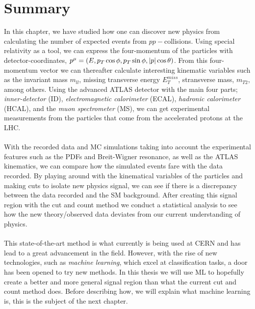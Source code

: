 \documentclass[12pt, a4paper]{book}
\begin{document}
\clearpage
\section{Summary}
In this chapter, we have studied how one can discover new physics from calculating the number of expected events from $pp-$collisions. Using special relativity as a tool, we can express the four-momentum of the particles with 
detector-coordinates, $p^\mu=(E,p_T\cos\phi,p_T\sin\phi,\abs{p}\cos\theta)$. From this four-momentum vector we can thereafter calculate interesting kinematic variables such as the invariant mass $m_{ll}$, missing transverse energy $E_T^{miss}$, 
stransverse mass, $m_{T2}$, among others. Using the advanced ATLAS detector with the main four parts; \textit{inner-detector} (ID), \textit{electromagnetic calorimeter} (ECAL), \textit{hadronic calorimeter} (HCAL), and the \textit{muon spectrometer} (MS), 
we can get experimental measurements from the particles that come from the accelerated protons at the LHC.\\
\\With the recorded data and MC simulations taking into account the experimental features such as the PDFs and Breit-Wigner resonance, as well as the ATLAS kinematics, we can compare how the simulated events fare with the data recorded. 
By playing around with the kinematical variables of the particles and making cuts to isolate new physics signal, we can see if there is a discrepancy between the data recorded and the SM background. After creating this signal region with the cut and count 
method we conduct a statistical analysis to see how the new theory/observed data deviates from our current understanding of physics.\\
\\This state-of-the-art method is what currently is being used at CERN and has lead to a great advancement in the field. However, with the rise of new technologies, such as \textit{machine learning}, which excel at classification tasks, a door has been 
opened to try new methods. In this thesis we will use ML to hopefully create a better and more general signal region than what the current cut and count method does. Before describing how, we will explain what machine learning is, this is the subject 
of the next chapter.
\end{document}
